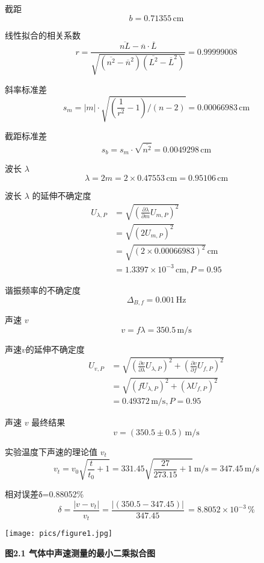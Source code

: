 \documentclass[10pt,a4paper]{article}	%
\makeatletter
\newenvironment{figurehere}
{\def\@captype{figure}}
{}
\makeatother
\begin{document}
	截距
	$$
	b=0.71355\,\mathrm{cm}
	$$

	线性拟合的相关系数
	$$
	r=\frac{\overline{nL}-\overline{n}\cdot\overline{L}}{\sqrt{\left(\overline{n^2}-\overline{n}^2\right)\left(\overline{L^2}-\overline{L}^2\right)}}=0.99999008
	$$

	斜率标准差
	$$
	s_m=\lvert m\rvert\cdot\sqrt{\left(\frac{1}{r^2}-1\right)/(n-2)}=0.00066983\,\mathrm{cm}
	$$

	截距标准差
	$$
	s_b=s_m\cdot\sqrt{\overline{n^2}}=0.0049298\,\mathrm{cm}
	$$
	
	波长 $\lambda$ 
	$$
	\lambda =2 m=2\times 0.47553\,\mathrm{cm}=0.95106\,\mathrm{cm}
	$$

	波长 $\lambda$ 的延伸不确定度
	$$
	\begin{aligned}
	U_{\lambda ,P}&=\sqrt{\left(\frac{\partial \lambda }{\partial m}U_{m,P}\right)^2}\\
	&=\sqrt{\left(2U_{m,P}\right)^2}\\
	&=\sqrt{\left(2\times 0.00066983\right)^2}\,\mathrm{cm}\\
	&=1.3397 \times 10^{-3}\,\mathrm{cm},P=0.95
	\end{aligned}
	$$
	
	谐振频率的不确定度
	$$
	\Delta_{B,f}=0.001\,\mathrm{Hz}
	$$
	
	声速 $v$
	$$
	v=f \lambda =350.5\,\mathrm{m/s}
	$$

	声速$v$的延伸不确定度
	$$
	\begin{aligned}
	U_{v,P}&=\sqrt{\left(\frac{\partial v}{\partial \lambda }U_{\lambda ,P}\right)^2+\left(\frac{\partial v}{\partial f}U_{f,P}\right)^2}\\
	&=\sqrt{\left(fU_{\lambda ,P}\right)^2+\left(\lambda U_{f,P}\right)^2}\\
	&=0.49372\,\mathrm{m/s},P=0.95
	\end{aligned}
	$$

	声速 $v$ 最终结果
	$$
	v=\left(350.5 \pm 0.5\right)\,\mathrm{m/s}
	$$
	
	实验温度下声速的理论值 $v_t$
	$$
	v_{t}=v_{0} \sqrt{\frac{t}{t_{0}} + 1}=331.45 \sqrt{\frac{27}{273.15}+1}\,\mathrm{m/s}=347.45\,\mathrm{m/s}
	$$

	相对误差δ=0.88052\%
	$$
	\delta =\frac{\left|{v - v_{t}}\right|}{v_{t}}=\frac{\left|{\left(350.5-347.45\right)}\right|}{347.45}\,\mathrm{}=8.8052 \times 10^{-3}\,\mathrm{\%}
	$$
	

	\begin{figurehere}
		\vspace*{0.3em}
		\centering
		\texttt{[image: pics/figure1.jpg]}
		\caption*{\bf 图2.1 气体中声速测量的最小二乘拟合图}
		\vspace*{0.8em}
	\end{figurehere}
	
\end{document}
